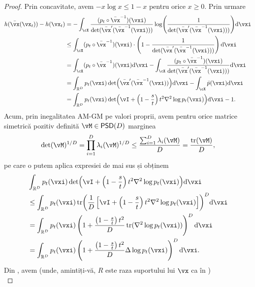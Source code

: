 \documentclass[../../book-main_ro.tex]{subfiles}
\begin{document}
\begin{proof}
    Prin concavitate, avem \(-x\log x \leq 1 - x\) pentru orice \(x \geq 0\). Prin urmare 
    \begin{align}
        h(\bar{\vx}(\vx_{t})) - h(\vx_{t})
        &= - \int_{\cX}\frac{(p_{t} \circ \bar{\vx}^{-1})(\vxi)}{\det(\bar{\vx}^{\prime}(\bar{\vx}^{-1}(\vxi)))}\log\rp{\frac{1}{\det(\bar{\vx}^{\prime}(\bar{\vx}^{-1}(\vxi)))}}\odif{\vxi} \\ 
        &\leq  \int_{\cX}(p_{t} \circ \bar{\vx}^{-1})(\vxi)\cdot \bp{1 - \frac{1}{\det(\bar{\vx}^{\prime}(\bar{\vx}^{-1}(\vxi)))}}\odif{\vxi} \\ 
        &= \int_{\cX}(p_{t} \circ \bar{\vx}^{-1})(\vxi)\odif{\vxi} - \int_{\cX}\frac{(p_{t} \circ \bar{\vx}^{-1})(\vxi)}{\det(\bar{\vx}^{\prime}(\bar{\vx}^{-1}(\vxi)))}\odif{\vxi} \\
        &= \int_{\R^{D}}p_{t}(\vxi)\det\rp{\bar{\vx}^{\prime}(\bar{\vx}^{-1}(\vxi))}\odif{\vxi} - \int_{\cX}\bar{p}(\vxi)\odif{\vxi} \\
        &= \int_{\R^{D}}p_{t}(\vxi)\det\rp{\vI + \bp{1 - \frac{s}{t}}t^{2}\nabla^{2}\log p_{t}(\vxi)}\odif{\vxi} - 1.
    \end{align}
    Acum, prin inegalitatea AM-GM pe valori proprii, avem pentru orice matrice simetrică pozitiv definită \(\vM \in \PSD(D)\) marginea 
    \begin{equation}
        \det(\vM)^{1/D} = \prod_{i = 1}^{D}\lambda_{i}(\vM)^{1/D} \leq \frac{\sum_{i = 1}^{D}\lambda_{i}(\vM)}{D} = \frac{\tr(\vM)}{D},
    \end{equation}
    pe care o putem aplica expresiei de mai sus și obținem 
    \begin{align}
        &\int_{\R^{D}}p_{t}(\vxi)\det\rp{\vI + \bp{1 - \frac{s}{t}}t^{2}\nabla^{2}\log p_{t}(\vxi)}\odif{\vxi} \\
        &\leq \int_{\R^{D}} p_{t}(\vxi) \tr\rp{\frac{1}{D}\bs{\vI + \bp{1 - \frac{s}{t}}t^{2}\nabla^{2}\log p_{t}(\vxi)}}^{D}\odif{\vxi} \\
        &= \int_{\R^{D}} p_{t}(\vxi)\bp{1 + \frac{\bp{1 - \frac{s}{t}}t^{2}}{D}\tr(\nabla^{2}\log p_{t}(\vxi))}^{D}\odif{\vxi} \\
        &= \int_{\R^{D}} p_{t}(\vxi)\bp{1 + \frac{\bp{1 - \frac{s}{t}}t^{2}}{D}\Delta \log p_{t}(\vxi)}^{D}\odif{\vxi}.
    \end{align}
    Din , avem (unde, amintiți-vă, \(R\) este raza suportului lui \(\vx\) ca în )
    \begin{equation}

\end{equation}
\end{proof}
\end{document}
